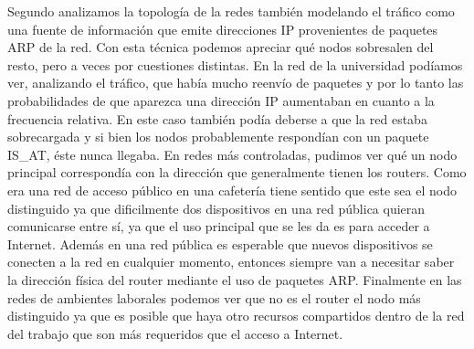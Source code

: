 Segundo analizamos la topología de la redes también modelando el tráfico como una fuente de información que emite direcciones IP provenientes de paquetes ARP de la red. Con esta técnica podemos apreciar qué nodos sobresalen del resto, pero a veces por cuestiones distintas. En la red de la universidad podíamos ver, analizando el tráfico, que había mucho reenvío de paquetes y por lo tanto las probabilidades de que aparezca una dirección IP aumentaban en cuanto a la frecuencia relativa. En este caso también podía deberse a que la red estaba sobrecargada y si bien los nodos probablemente respondían con un paquete IS\_AT, éste nunca llegaba. En redes más controladas, pudimos ver qué un nodo principal correspondía con la dirección que generalmente tienen los routers. Como era una red de acceso público en una cafetería tiene sentido que este sea el nodo distinguido ya que dificilmente dos dispositivos en una red pública quieran comunicarse entre sí, ya que el uso principal que se les da es para acceder a Internet. Además en una red pública es esperable que nuevos dispositivos se conecten a la red en cualquier momento, entonces siempre van a necesitar saber la dirección física del router mediante el uso de paquetes ARP. Finalmente en las redes de ambientes laborales podemos ver que no es el router el nodo más distinguido ya que es posible que haya otro recursos compartidos dentro de la red del trabajo que son más requeridos que el acceso a Internet.